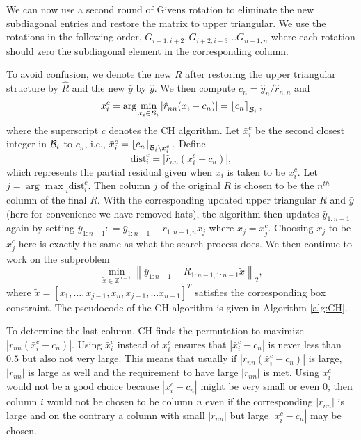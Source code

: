 \documentclass[12pt,Bold,letterpaper]{mcgilletdclass}
\newcommand{\be}{\begin{equation}}
\newcommand{\ee}{\end{equation}}
\newcommand{\dist}{\mathrm{dist}}
\begin{document}
We can now use a second round of Givens rotation to eliminate the new subdiagonal entries and restore the matrix to upper triangular. We use the rotations in the following order, $G_{i+1,i+2}, G_{i+2,i+3} \dots G_{n-1,n}$ where each rotation should zero the subdiagonal element in the corresponding column.

To avoid confusion, we denote the new $R$ after restoring the upper triangular structure by $\hat{R}$ and the new $\bar{y}$ by $\hat{y}$.
We then compute  $c_n=\hat{y}_n/\hat{r}_{n,n}$ and 
\be
x_i^c=\arg\min_{x_i\in {\cal B}_i}\left |\hat{r}_{nn}(x_i- c_n) \right | = \left \lfloor c_n \right \rceil_{{\cal B}_i},
\label{eq:xic}
\ee
where the superscript $c$ denotes the CH algorithm. 
Let $\bar{x}_i^c$ be the second closest integer in ${{\cal B}_i}$ to $c_n$,
i.e.,  
$\bar{x}_i^c= \left \lfloor c_n \right \rceil_{{\cal B}_i\backslash x_i^c}.$
Define
\be
\dist_i^c = |\hat{r}_{nn}( \bar{x}_i^c -c_n) |, 
\label{eq:dic}
\ee
which represents the partial residual given when $x_i$ is taken to be $\bar{x}_i^c$.
Let $j = {\arg\max}_i \dist_i^c$.
Then  column $j$ of the original $R$ is chosen to be the $n^{th}$ column of the final $R$.
With the corresponding updated upper triangular $R$ and $\bar{y}$
(here for convenience we have removed hats),
the algorithm then updates  $\bar{y}_{1:n-1}$ again
by setting $\bar{y}_{1:n-1}: = \bar{y}_{1:n-1} - r_{1:n-1,n}x_j$ where $x_j=x_j^c$. 
Choosing  $x_j$ to be  $x_j^c$ here is exactly the same as what the search process does.
We then continue to work on the subproblem 
\be
\min_{\tilde{x}\in \mathbb{Z}^{n-1}} \left \| \bar{y}_{1:n-1}-R_{1:n-1,1:n-1}\tilde{x} \right \|_2,
\label{eq:subc}
\ee
where $\tilde{x}=[x_1,\ldots, x_{j-1}, x_n, x_{j+1}, \ldots x_{n-1}]^T$ satisfies the corresponding box constraint.
The pseudocode of the CH algorithm is given in Algorithm \ref{alg:CH}.

To determine the last column, CH finds the permutation to 
maximize $\left |r_{nn}(\bar{x}_i^c-c_n) \right |$. Using $\bar{x}_i^c$ instead of $x_i^c$
ensures that $\left | \bar{x}_i^c-c_n \right |$ is never less than $0.5$ but
also not very large. This means that usually if $\left | r_{nn}(\bar{x}_i^c-c_n)
\right |$ is large, $\left | r_{nn} \right |$ is large as well and the
requirement to have large $|r_{nn}|$ %
is met.
Using $x_i^c$ would not be a good choice because $\left | x_i^c - c_n \right |$ might be 
very small or even $0$, then column $i$ would not be chosen to be column $n$
even if the corresponding $|r_{nn}|$ is large and on the contrary a column with small $|r_{nn}|$
but large $|x_i^c-c_n|$ may be chosen. 
\end{document}

